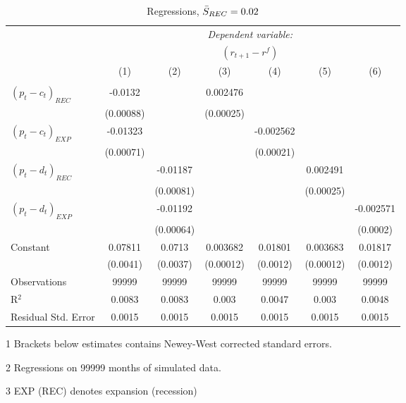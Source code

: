 \begin{table}[H]
\centering   
  \caption{Regressions, $\Bar{S}_{REC} = 0.02$}           
  \label{tab:regress2}     
  \begin{threeparttable}
\begin{tabular}{@{\hspace{5pt}}l@{\hspace{5pt}}cccccc} 
\toprule 
 & \multicolumn{6}{c}{\textit{Dependent variable:}} \\ 
 & \multicolumn{6}{c}{$\left(r_{t+1}-r^f\right)$} \\ 
 \cmidrule(rr){2-7}
 & (1) & (2) & (3) & (4) & (5) & (6) \\ 
\midrule  
\\[-2.1ex] $\left( p_t - c_t \right)_{REC}$ &-0.0132& &0.002476 & & &\\ 
  & (0.00088) & &(0.00025) & & & \\ 
 \addlinespace 
  $\left( p_t - c_t \right)_{EXP}$ &-0.01323  &    & &-0.002562 & &  \\ 
  & (0.00071) & & &(0.00021) & & \\ 
 \addlinespace 
  $\left( p_t - d_t \right)_{REC}$ & &-0.01187& & & 0.002491  &   \\ 
                                   & &  (0.00081) & & & (0.00025) &    \\ 
 \addlinespace 
  $\left( p_t - d_t \right)_{EXP}$ & &   -0.01192& & & &-0.002571 \\ 
                                   & &  (0.00064) & & & &(0.0002) \\ 
 \addlinespace 
 Constant &0.07811 &0.0713&0.003682 &0.01801 &0.003683 &0.01817 \\ 
          &(0.0041) &(0.0037)&(0.00012)&(0.0012)&(0.00012)&(0.0012) \\ 
 \addlinespace 
\midrule  
Observations & 99999 & 99999&99999 & 99999&99999&99999\\
R$^{2}$ &0.0083 & 0.0083&0.003&0.0047&0.003&0.0048 \\ 
Residual Std. Error &0.0015 & 0.0015&0.0015&0.0015&0.0015&0.0015 \\ 
\bottomrule 
\end{tabular} 
\begin{tablenotes}
\footnotesize{
\item[1] Brackets below estimates contains Newey-West corrected standard errors. 
\item[2] Regressions on 99999 months of simulated data.
\item[3] EXP (REC) denotes expansion (recession)
}
\end{tablenotes}
\end{threeparttable}
\end{table} 
